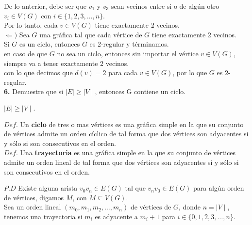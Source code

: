 \documentclass[12pt]{article}
\begin{document}
De lo anterior, debe ser que $v_1$ y $v_3$ sean vecinos entre si o de algún otro $v_i \in V(G)$ con $i \in \{1, 2, 3, \dots, n\}$.\\

Por lo tanto, cada $v \in V(G)$ tiene exactamente 2 vecinos.\\

$\Longleftarrow)$ Sea $G$ una gráfica tal que cada vértice de $G$ tiene exactamente 2 vecinos.\\

Si $G$ es un ciclo, entonces $G$ es $2$-regular y términamos.\\

en caso de que $G$ no sea un ciclo, entonces sin importar el vértice $v \in V(G)$, siempre va a tener exactamente 2 vecinos.\\

con lo que decimos que $d(v) = 2$ para cada $v \in V(G)$, por lo que $G$ es $2$-regular.\\


%
%
\textbf{6.} Demuestre que si $\mid E \mid \geq\mid V \mid$, entonces G contiene un ciclo.

\begin{tcolorbox}[title=\textbf{Hipotesis}, colback=red!15!white, colframe=black!, breakable]
    $\mid E \mid \geq \mid V \mid$.
\end{tcolorbox}

\begin{tcolorbox}[title=\textbf{Definiciones}, colback=blue!15!white, colframe=black!]
    $Def$. Un \textbf{ciclo} de tres o mas vértices es una gráfica simple en la que su conjunto de
    vértices admite un orden cíclico de tal forma que dos vértices son adyacentes si y sólo si son consecutivos en el orden.\\

    $Def$. Una \textbf{trayectoria} es una gráfica simple en la que su conjunto de vértices admite un orden lineal de tal forma 
    que dos vértices son adyacentes si y sólo si son consecutivos en el orden.
\end{tcolorbox}

$P.D$ Existe alguna arista $v_0 v_n \in E(G)$ tal que $v_n v_0 \in E(G)$ para algún orden de vértices, digamos $M$, con $M \subseteq V(G)$.\\

Sea un orden lineal $(m_0, m_1, m_2, \dots , m_n)$ de vértices de $G$, donde $n = \mid V \mid$, tenemos una trayectoria si $m_i$ es adyacente a $m_i+1$
para $i \in \{0, 1, 2, 3, \dots, n\}$.\\
\end{document}
